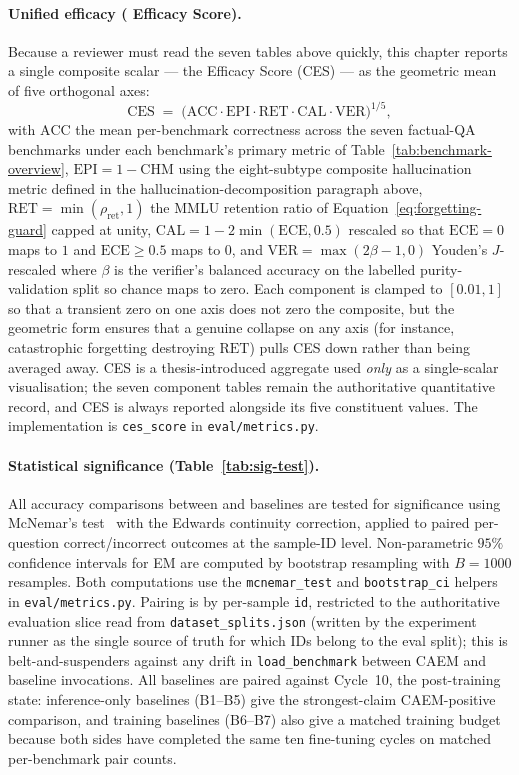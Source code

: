 \paragraph{Unified efficacy (\caem{} Efficacy Score).}
Because a reviewer must read the seven tables above quickly, this chapter reports a single composite scalar --- the \caem{} Efficacy Score (CES) --- as the geometric mean of five orthogonal axes:
\[
\mathrm{CES} \;=\; \bigl(\mathrm{ACC} \cdot \mathrm{EPI} \cdot \mathrm{RET} \cdot \mathrm{CAL} \cdot \mathrm{VER}\bigr)^{1/5},
\]
with $\mathrm{ACC}$ the mean per-benchmark correctness across the seven factual-QA benchmarks under each benchmark's primary metric of Table~\ref{tab:benchmark-overview}, $\mathrm{EPI} = 1 - \mathrm{CHM}$ using the eight-subtype composite hallucination metric defined in the hallucination-decomposition paragraph above, $\mathrm{RET} = \min(\rho_{\text{ret}}, 1)$ the MMLU retention ratio of Equation~\ref{eq:forgetting-guard} capped at unity, $\mathrm{CAL} = 1 - 2\min(\mathrm{ECE}, 0.5)$ rescaled so that $\mathrm{ECE} = 0$ maps to $1$ and $\mathrm{ECE} \geq 0.5$ maps to $0$, and $\mathrm{VER} = \max(2\beta - 1, 0)$ Youden's $J$-rescaled where $\beta$ is the verifier's balanced accuracy on the labelled purity-validation split so chance maps to zero. Each component is clamped to $[0.01, 1]$ so that a transient zero on one axis does not zero the composite, but the geometric form ensures that a genuine collapse on any axis (for instance, catastrophic forgetting destroying $\mathrm{RET}$) pulls CES down rather than being averaged away. CES is a thesis-introduced aggregate used \emph{only} as a single-scalar visualisation; the seven component tables remain the authoritative quantitative record, and CES is always reported alongside its five constituent values. The implementation is \texttt{ces\_score} in \texttt{eval/metrics.py}.

\paragraph{Statistical significance (Table~\ref{tab:sig-test}).}
All accuracy comparisons between \caem{} and baselines are tested for significance using McNemar's test~\cite{mcnemar1947note} with the Edwards continuity correction, applied to paired per-question correct/incorrect outcomes at the sample-ID level. Non-parametric $95\%$ confidence intervals for EM are computed by bootstrap resampling with $B = 1000$ resamples. Both computations use the \texttt{mcnemar\_test} and \texttt{bootstrap\_ci} helpers in \texttt{eval/metrics.py}. Pairing is by per-sample \texttt{id}, restricted to the authoritative evaluation slice read from \texttt{dataset\_splits.json} (written by the experiment runner as the single source of truth for which IDs belong to the eval split); this is belt-and-suspenders against any drift in \texttt{load\_benchmark} between CAEM and baseline invocations. All baselines are paired against \caem{} Cycle~10, the post-training state: inference-only baselines (B1--B5) give the strongest-claim CAEM-positive comparison, and training baselines (B6--B7) also give a matched training budget because both sides have completed the same ten fine-tuning cycles on matched per-benchmark pair counts.

